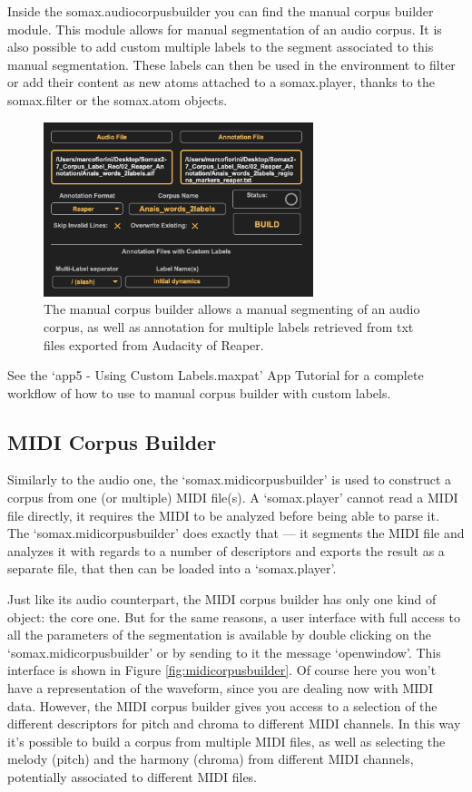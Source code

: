 Inside the somax.audiocorpusbuilder you can find the manual corpus builder module. This module allows for manual segmentation of an audio corpus. It is also possible to add custom multiple labels to the segment associated to this manual segmentation. These labels can then be used in the environment to filter or add their content as new atoms attached to a somax.player, thanks to the somax.filter or the somax.atom objects.

\begin{figure}[H]
    \centering        
 	\includegraphics[width=0.7\textwidth, keepaspectratio]{img/manual_corpus_builder.png}
    \caption{The manual corpus builder allows a manual segmenting of an audio corpus, as well as annotation for multiple labels retrieved from txt files exported from Audacity of Reaper.}
    \label{fig:manualcorpusbuilder}
\end{figure}

See the `app5 - Using Custom Labels.maxpat' App Tutorial for a complete workflow of how to use to manual corpus builder with custom labels.

\subsection{MIDI Corpus Builder}

Similarly to the audio one, the `somax.midicorpusbuilder' is used to construct a corpus from one (or multiple) MIDI file(s). A `somax.player' cannot read a MIDI file directly, it requires the MIDI to be analyzed before being able to parse it. The `somax.midicorpusbuilder' does exactly that — it segments the MIDI file and analyzes it with regards to a number of descriptors and exports the result as a separate file, that then can be loaded into a `somax.player'.

Just like its audio counterpart, the MIDI corpus builder has only one kind of object: the core one. But for the same reasons, a user interface with full access to all the parameters of the segmentation is available by double clicking on the `somax.midicorpusbuilder' or by sending to it the message `openwindow'. This interface is shown in Figure \ref{fig:midicorpusbuilder}. Of course here you won't have a representation of the waveform, since you are dealing now with MIDI data. However, the MIDI corpus builder gives you access to a selection of the different descriptors for pitch and chroma to different MIDI channels. In this way it's possible to build a corpus from multiple MIDI files, as well as selecting the melody (pitch) and the harmony (chroma) from different MIDI channels, potentially associated to different MIDI files.

